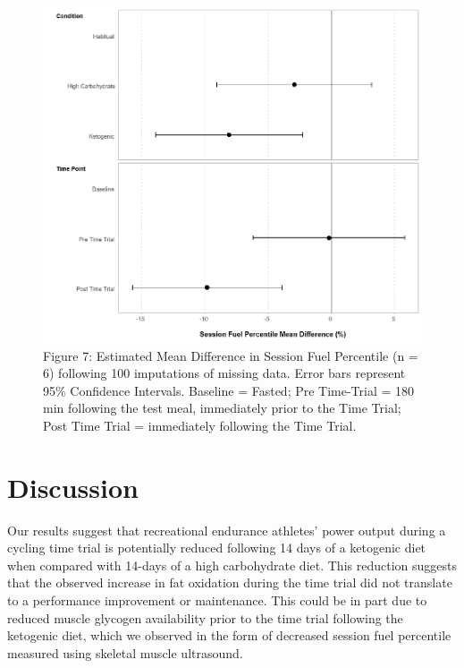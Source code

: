 \documentclass[]{cik}%
\begin{document}
\begin{figure}[H]
\includegraphics[width=1\linewidth]{figures/figure7} \caption{Figure 7: Estimated Mean Difference in Session Fuel Percentile (n = 6) following 100 imputations of missing data. Error bars represent 95\% Confidence Intervals. Baseline = Fasted; Pre Time-Trial = 180 min following the test meal, immediately prior to the Time Trial; Post Time Trial = immediately following the Time Trial.}\label{fig:fig7pdf}
\end{figure}

\hypertarget{discussion}{%
\section{Discussion}\label{discussion}}

Our results suggest that recreational endurance athletes' power output
during a cycling time trial is potentially reduced following 14 days of
a ketogenic diet when compared with 14-days of a high carbohydrate diet.
This reduction suggests that the observed increase in fat oxidation
during the time trial did not translate to a performance improvement or
maintenance. This could be in part due to reduced muscle glycogen
availability prior to the time trial following the ketogenic diet, which
we observed in the form of decreased session fuel percentile measured
using skeletal muscle ultrasound.
\end{document}
